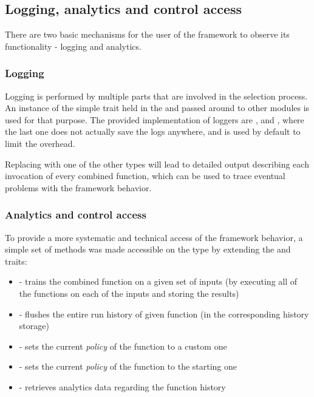\subsection{Logging, analytics and control access}

There are two basic mechanisms for the user of the framework to observe its functionality - logging and analytics.

\subsubsection{Logging}

Logging is performed by multiple parts that are involved in the selection process. An instance of the simple  trait held in the  and passed around to other modules is used for that purpose. The provided implementation of loggers are ,  and , where the last one does not actually save the logs anywhere, and is used by default to limit the overhead.

Replacing  with one of the other types will lead to detailed output describing each invocation of every combined function, which can be used to trace eventual problems with the framework behavior.

\subsubsection{Analytics and control access}
\label{subsubsec:analytics}

To provide a more systematic and technical access of the framework behavior, a simple set of methods was made accessible on the  type by extending the  and  traits:

\begin{itemize}
	\item {} - trains the combined function on a given set of inputs (by executing all of the functions on each of the inputs and storing the results)
	\item {} - flushes the entire run history of given function (in the corresponding history storage)
	\item {} - sets the current \textit{policy} of the function to a custom one
	\item {} - sets the current \textit{policy} of the function to the starting one
	\item {} - retrieves analytics data regarding the function history
\end{itemize}

